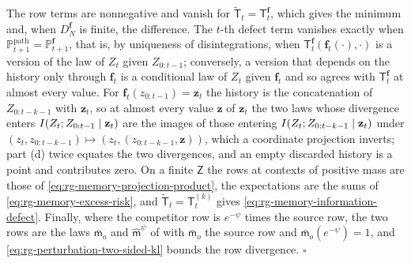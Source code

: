 The row terms are nonnegative and vanish for
$\widetilde{\mathsf T}_t=\mathsf T^{\mathbf f}_t$, which gives the minimum and, when
$D^{\mathbf f}_N$ is finite, the difference. The $t$-th defect term vanishes exactly
when $\mathbb P^{\mathrm{path}}_{t+1}=\mathbb P^{\mathbf f}_{t+1}$, that is, by
uniqueness of disintegrations, when
$\mathsf T^{\mathbf f}_t(\mathbf f_t(\cdot),\cdot)$ is a version of the law of $Z_t$
given $Z_{0:t-1}$; conversely, a version that depends on the history only through
$\mathbf f_t$ is a conditional law of $Z_t$ given $\mathbf f_t$ and so agrees with
$\mathsf T^{\mathbf f}_t$ at almost every value. For
$\mathbf f_t(z_{0:t-1})=\mathbf z_t$ the history is the concatenation of
$Z_{0:t-k-1}$ with $\mathbf z_t$, so at almost every value $\mathbf z$ of
$\mathbf z_t$ the two laws whose divergence enters
$I(Z_t;Z_{0:t-1}\mid\mathbf z_t)$ are the images of those entering
$I(Z_t;Z_{0:t-k-1}\mid\mathbf z_t)$ under
$(z_t,z_{0:t-k-1})\mapsto(z_t,(z_{0:t-k-1},\mathbf z))$, which a coordinate projection
inverts; part (d) twice equates the two divergences, and an empty discarded history
is a point and contributes zero. On a finite $\mathsf Z$ the rows at contexts of
positive mass are those of \eqref{eq:rg-memory-projection-product}, the expectations
are the sums of \eqref{eq:rg-memory-excess-risk}, and
$\widetilde{\mathsf T}_t=\mathsf T^{(k)}_t$ gives
\eqref{eq:rg-memory-information-defect}. Finally, where the competitor row is
$e^{-\psi}$ times the source row, the two rows are the laws $\bar{\mathsf m}_o$ and
$\widehat{\mathsf m}^\psi$ of  with
$\bar{\mathsf m}_o$ the source row and $\bar{\mathsf m}_o(e^{-\psi})=1$, and
\eqref{eq:rg-perturbation-two-sided-kl} bounds the row divergence. $\square$

